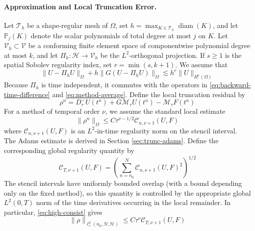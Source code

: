 \documentclass[11pt]{article}
\begin{document}
\paragraph{Approximation and Local Truncation Error.}
Let \(\mathcal T_h\) be a shape-regular mesh of \(\Omega\), set
\(h=\max_{K\in\mathcal T_h}\operatorname{diam}(K)\), and let
\(\mathbb P_j(K)\) denote the scalar polynomials of total degree at most
\(j\) on \(K\). Let \(\mathcal V_h\subset\mathcal V\) be a conforming finite
element space of componentwise polynomial degree at most \(k\), and let
\(\Pi_h:\mathcal H\to\mathcal V_h\) be the \(L^2\)-orthogonal projection. If
\(s\ge1\) is the spatial Sobolev regularity index, set
\(r=\min(s,k+1)\). We assume that
\begin{equation}
\|U-\Pi_hU\|_{\Omega}+h\|G(U-\Pi_hU)\|_{\Omega}
\lesssim h^r\|U\|_{H^r(\Omega)} \label{eq:spatial-approximation}
\end{equation}
Because \(\Pi_h\) is time independent, it commutes with the operators in
\eqref{eq:backward-time-difference} and \eqref{eq:method-average}. Define the
local truncation residual by
\begin{equation}
\rho^n=D_{\tau}^{-}U(t^n)+G\mathcal M_{\tau}U(t^n)
-\mathcal M_{\tau}F(t^n) \label{eq:local-truncation-residual}
\end{equation}
For a method of temporal order \(\nu\), we assume the standard local estimate
\begin{equation}
\|\rho^n\|_{\Omega}\le C\tau^{\nu-1/2}\mathcal C_{n,\nu+1}(U,F) \label{eq:high-consist}
\end{equation}
where \(\mathcal C_{n,\nu+1}(U,F)\) is an \(L^2\)-in-time regularity norm on the
stencil interval. The Adams estimate is derived in Section
\ref{sec:trunc-adams}.
Define the corresponding global regularity quantity by
\begin{equation}
\mathcal C_{T,\nu+1}(U,F)
=\left(\sum_{n=n_0}^{N}\mathcal C_{n,\nu+1}(U,F)^2\right)^{1/2}
\label{eq:global-truncation-regularity}
\end{equation}
The stencil intervals have uniformly bounded overlap (with a bound depending
only on the fixed method), so this quantity is controlled by the appropriate
global \(L^2(0,T)\) norm of the time derivatives occurring in the local
remainder. In particular, \eqref{eq:high-consist} gives
\begin{equation}
\|\rho\|_{\ell_{\tau}^2(n_0,N;\mathcal H)}
\le C\tau^\nu\mathcal C_{T,\nu+1}(U,F)
\label{eq:global-truncation-bound}
\end{equation}
\end{document}
